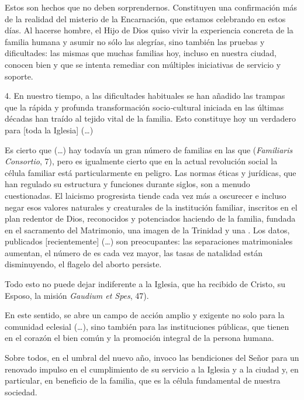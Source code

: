 \begin{body}
					Estos son hechos que no deben sorprendernos. Constituyen una confirmación más de la realidad del misterio de la Encarnación, que estamos celebrando en estos días. Al hacerse hombre, el Hijo de Dios quiso vivir la experiencia concreta de la familia humana y asumir no sólo las alegrías, sino también las pruebas y dificultades: las mismas que muchas familias hoy, incluso en nuestra ciudad, conocen bien y que se intenta remediar con múltiples iniciativas de servicio y soporte.
					
					4. En nuestro tiempo, a las dificultades habituales se han añadido las trampas que la rápida y profunda transformación socio\emph{-}cultural iniciada en las últimas décadas han traído al tejido vital de la familia. Esto constituye hoy un verdadero  para {[}toda la Iglesia{]} (\ldots{})
					
					Es cierto que (\ldots{}) hay todavía un gran número de familias en las que  (\emph{Familiaris Consortio}, 7), pero es igualmente cierto que en la actual revolución social la célula familiar está particularmente en peligro. Las normas éticas y jurídicas, que han regulado su estructura y funciones durante siglos, son a menudo cuestionadas. El laicismo progresista tiende cada vez más a oscurecer e incluso negar esos valores naturales y creaturales de la institución familiar, inscritos en el plan redentor de Dios, reconocidos y potenciados haciendo de la familia, fundada en el sacramento del Matrimonio, una imagen de la Trinidad y una . Los datos, publicados {[}recientemente{]} (\ldots{}) son preocupantes: las separaciones matrimoniales aumentan, el número de  es cada vez mayor, las tasas de natalidad están disminuyendo, el flagelo del aborto persiste.
					
					Todo esto no puede dejar indiferente a la Iglesia, que ha recibido de Cristo, su Esposo, la misión  \emph{Gaudium et Spes}, 47).
					
					En este sentido, se abre un campo de acción amplio y exigente no solo para la comunidad eclesial (\ldots{}), sino también para las instituciones públicas, que tienen en el corazón el bien común y la promoción integral de la persona humana.
					
					Sobre todos, en el umbral del nuevo año, invoco las bendiciones del Señor para un renovado impulso en el cumplimiento de su servicio a la Iglesia y a la ciudad y, en particular, en beneficio de la familia, que es la célula fundamental de nuestra sociedad.
					

\end{body}
